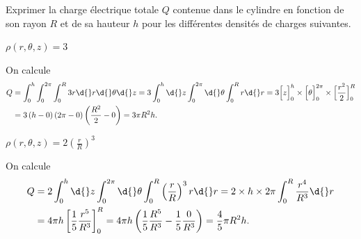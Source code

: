 \medskip

Exprimer la charge électrique totale $Q$ contenue dans le cylindre en fonction de son rayon $R$ et de sa hauteur $h$ pour les différentes densités de charges suivantes.


\debutEntrainement




\begin{enonce}
	$\rho\left(r,\theta,z\right) = 3$ 
\end{enonce}



\begin{corrige}
On calcule
\begin{align*}
	Q &= \int_{0}^{h} \int_{0}^{2\pi} \int_{0}^{R} 3 r 
	\d{}r \d{} \theta \d{} z
	= 3 \int_{0}^{h} \d{} z \int_{0}^{2\pi} \d{} \theta \int_{0}^{R} r \d{}r
	= 3 \Big[ z \Big]^{h}_{0}\times \Big[ \theta \Big]^{2\pi}_{0} \times \Big[ \frac{r^2}{2} \Big]^{R}_{0}\\
	&= 3 \left( h -0 \right) \left( 2\pi - 0 \right) \left( \frac{R^2}{2} - 0 \right)
	= 3\pi R^2h.
\end{align*}
\end{corrige}

\begin{enonce}	
	$\rho\left(r,\theta,z\right) = 2\left(\frac{r}{R}\right)^3$
\end{enonce}


\begin{corrige}
On calcule
	\begin{align*}
		Q &= 2\int_{0}^{h} \d{} z \int_{0}^{2\pi} \d{} \theta  \int_{0}^{R} \left( \frac{r}{R} \right)^3 r \d{}r 
		= 2 \times h \times 2\pi \int^{R}_{0} \frac{r^4}{R^3} \d{}r \\
		&= 4\pi h \left[ \frac{1}{5} \frac{r^5}{R^3} \right]^{R}_{0}
		= 4\pi h \left( \frac{1}{5} \frac{R^5}{R^3} - \frac{1}{5} \frac{0}{R^3} \right)
		= \frac{4}{5}\pi R^2h.
	\end{align*}
\end{corrige}

